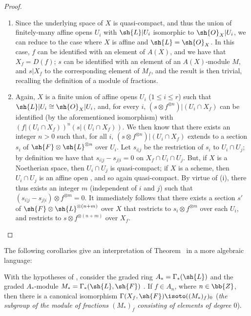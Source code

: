 \begin{proof}
\medskip\noindent
\begin{enumerate}
  \item[(i)] Since the underlying space of $X$ is quasi-compact, and thus the union of
    finitely-many affine opens $U_i$ with $\sh{L}|U_i$ isomorphic to
    $\sh{O}_X|U_i$, we can reduce to the case where $X$ is affine and $\sh{L}=\sh{O}_X$.
    In this case, $f$ can be identified with an element of $A(X)$, and we have that
    $X_f=D(f)$; $s$ can be identified with an element of an $A(X)$-module $M$, and
    $s|X_f$ to the corresponding element of $M_f$, and the result is then trivial,
    recalling the definition of a module of fractions.
  \item[(ii)] Again, $X$ is a finite union of affine opens $U_i$ ($1\leq i\leq r$)
    such that $\sh{L}|U_i\cong\sh{O}_X|U_i$, and, for every $i$,
    $(s\otimes f^{\otimes n})|(U_i\cap X_f)$ can be identified (by the aforementioned
    isomorphism) with $(f|(U_i\cap X_f))^n(s|(U_i\cap X_f))$. We then know
     that there exists an integer $n>0$ such that, for all
    $i$, $(s\otimes f^{\otimes n})|(U_i\cap X_f)$ extends to a section $s_i$ of
    $\sh{F}\otimes\sh{L}^{\otimes n}$ over $U_i$. Let $s_{i|j}$ be the restriction
    of $s_i$ to $U_i\cap U_j$; by definition we have that $s_{i|j}-s_{j|i}=0$ on
    $X_f\cap U_i\cap U_j$. But, if $X$ is a Noetherian space, then $U_i\cap U_j$ is
    quasi-compact; if $X$ is a scheme, then $U_i\cap U_j$ is an affine open
    , and so again quasi-compact. By virtue of (i), there thus
    exists an integer $m$ (independent of $i$ and $j$) such that
    $(s_{i|j}-s_{j|i})\otimes f^{\otimes m}=0$. It immediately follows that there
    exists a section $s'$ of $\sh{F}\otimes\sh{L}^{\otimes(n+m)}$ over $X$ that
    restricts to $s_i\otimes f^{\otimes m}$ over each $U_i$, and restricts to
    $s\otimes f^{\otimes(n+m)}$ over $X_f$.
\end{enumerate}
\end{proof}

The following corollaries give an interpretation of Theorem~ in a more
algebraic language:
\begin{corollary}[9.3.2]
\label{I.9.3.2}
With the hypotheses of , consider the graded ring $A_*=\Gamma_*(\sh{L})$
and the graded $A_*$-module $M_*=\Gamma_*(\sh{L},\sh{F})$ . If $f\in A_n$,
where $n\in\bb{Z}$, then there is a canonical isomorphism
$\Gamma(X_f,\sh{F})\isoto((M_*)_f)_0$ (\emph{the subgroup of the module of
fractions $(M_*)_f$ consisting of elements of degree $0$}).
\end{corollary}

